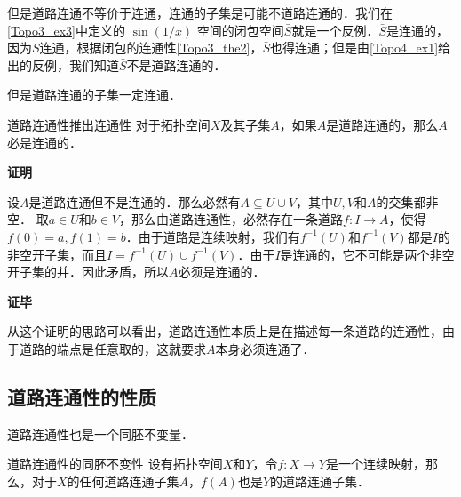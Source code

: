 但是道路连通不等价于连通，连通的子集是可能不道路连通的．我们在\autoref{Topo3_ex3}中定义的 $\sin(1/x)$ 空间的闭包空间$\bar{S}$就是一个反例．$\bar{S}$是连通的，因为$S$连通，根据闭包的连通性\autoref{Topo3_the2}，$\bar{S}$也得连通；但是由\autoref{Topo4_ex1}给出的反例，我们知道$\bar{S}$不是道路连通的．

但是道路连通的子集一定连通．

\begin{theorem}{道路连通性推出连通性}\label{Topo4_the1}
对于拓扑空间$X$及其子集$A$，如果$A$是道路连通的，那么$A$必是连通的．
\end{theorem}

\textbf{证明}

设$A$是道路连通但不是连通的．那么必然有$A\subseteq U\cup V$，其中$U, V$和$A$的交集都非空．
取$a\in U$和$b\in V$，那么由道路连通性，必然存在一条道路$f:I\rightarrow A$，使得$f(0)=a, f(1)=b$．由于道路是连续映射，我们有$f^{-1}(U)$和$f^{-1}(V)$都是$I$的非空开子集，而且$I=f^{-1}(U)\cup f^{-1}(V)$．由于$I$是连通的，它不可能是两个非空开子集的并．因此矛盾，所以$A$必须是连通的．

\textbf{证毕}

从这个证明的思路可以看出，道路连通性本质上是在描述每一条道路的连通性，由于道路的端点是任意取的，这就要求$A$本身必须连通了．

\subsection{道路连通性的性质}

道路连通性也是一个同胚不变量．

\begin{theorem}{道路连通性的同胚不变性}
设有拓扑空间$X$和$Y$，令$f:X\rightarrow Y$是一个连续映射，那么，对于$X$的任何道路连通子集$A$，$f(A)$也是$Y$的道路连通子集．
\end{theorem}